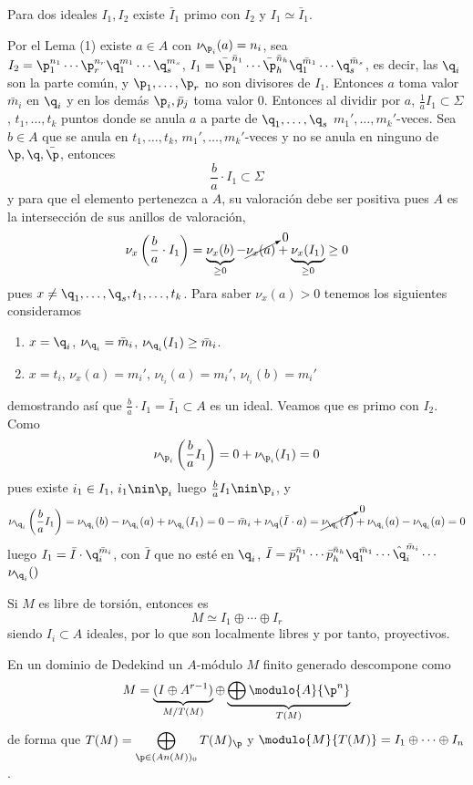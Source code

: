 \begin{lem}[3]
    Para dos ideales $I_1,I_2$ existe $\bar I_1$ primo con $I_2$ y $I_1\simeq \bar I_1$. 
\end{lem}
\begin{dem}
    Por el Lema (1) existe $a\in A$ con $\nu_{\p_i}(a)=n_i$, sea $I_2 = \p_1^{n_1}\cdots \p_r^{n_r} \q_1^{m_1} \cdots \q_s^{m_s}$, $I_1=\bar \p_1^{\bar n_1}\cdots \bar \p_h^{\bar n_h} \q_1^{\bar m_1} \cdots \q_s^{\bar m_s}$, es decir, las $\q_i$ son la parte com\'un, y $\p_1, \ldots, \p_r$ no son divisores de $I_1$. Entonces $a$ toma valor $\bar m_i$ en $\q_i$ y en los dem\'as $\p_i, \bar p_j$ toma valor $0$. Entonces al dividir por $a$, $\frac{1}{a}I_1\subset \Sigma$, $t_1, \ldots, t_k$ puntos donde se anula $a$ a parte de $\q_1, \ldots, \q_s$ $m_1',\ldots,m_k'$-veces. Sea $b \in A$ que se anula en $t_1, \ldots, t_k$, $m_1',\ldots,m_k'$-veces y no se anula en ninguno de $\p,\q, \bar \p$, entonces 
    $$\frac{b}{a} \cdot I_1 \subset \Sigma$$
    y para que el elemento pertenezca a $A$, su valoraci\'on debe ser positiva pues $A$ es la intersecci\'on de sus anillos de valoraci\'on,
    $$\nu_x\left( \frac{b}{a} \cdot I_1 \right) = \underbrace{\nu_x(b)}_{\geq 0} - \cancelto{0}{\nu_x(a)} + \underbrace{\nu_x(I_1) }_{\geq 0} \geq 0$$
    pues $x \neq \q_1, \ldots, \q_s, t_1, \ldots, t_k$. Para saber $\nu_x(a)>0$ tenemos los siguientes consideramos
\begin{enumerate}
    \item $x=\q_i$, $\nu_{\q_i} = \bar m_i$, $\nu_{\q_i}(I_1) \geq \bar m_i$.
    \item $x=t_i$, $\nu_x(a)=m_i'$, $\nu_{t_i}(a) = m_i', \, \nu_{t_i}(b) = m_i'$
\end{enumerate}
demostrando as\'i que $\frac{b}{a} \cdot I_1 = \bar I_1 \subset A$ es un ideal. Veamos que es primo con $I_2$. Como 
$$\nu_{\p_i}\left( \frac{b}{a} I_1 \right)=0 + \nu_{\p_i}(I_1) = 0$$
pues existe $i_1 \in I_1,\, i_1 \nin \p_i$ luego $\frac{b}{a} I_1 \nin \p_i$, y
$$\nu_{\q_i}\left( \frac{b}{a} I_1  \right) = \nu_{\q_i}(b) - \nu_{\q_i}(a)+\nu_{\q_i}(I_1) = 0 - \bar m_i + \nu_\q(\bar I \cdot a) = \cancelto{0}{\nu_{\q_i}(\bar I )} + \nu_{\q_i}(a) - \nu_{\q_i}(a)  = 0  $$
luego $I_1 = \bar I \cdot \q_i^{\bar m_i}$, con $\bar I$ que no est\'e en $\q_i$, $\bar I = \bar p_1^{\bar n_1} \cdots \bar p_h^{\bar n_h} \q_1^{\bar m_1} \cdots \hat \q_i^{\bar m_i} \cdots $ $\nu_{\q_i}()$
\end{dem}
\begin{cor}
    Si $M$ es libre de torsi\'on, entonces es
    $$M \simeq I_1 \oplus \cdots \oplus I_r$$
    siendo $I_i \subset A $ ideales, por lo que son localmente libres y por tanto, proyectivos.
\end{cor}
\begin{cor}
    En un dominio de Dedekind un $A$-m\'odulo $M$ finito generado descompone como
    $$ M =\underbrace{ (I \oplus A^{r-1})}_{M/T(M)} \oplus \underbrace{\bigoplus \modulo{A}{\p^n}}_{T(M)}$$
    de forma que $T(M) =\displaystyle \bigoplus_{\p \in (An(M))_0} T(M)_\p$ y $\modulo{M}{T(M)} = I_1 \oplus \cdots \oplus I_n$. 
\end{cor}

